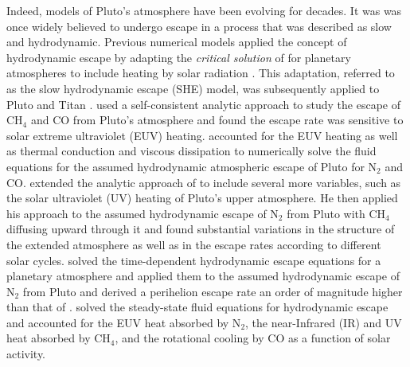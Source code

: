 \documentclass[times,12]{article}
\begin{document}
\indent Indeed, models of Pluto's atmosphere have been evolving for decades. It was was once widely believed to undergo escape in a process that was described as slow and hydrodynamic. Previous numerical models applied the concept of hydrodynamic escape by adapting the \textit{critical solution} of \cite{Parker1964} for planetary atmospheres to include heating by solar radiation \citep{Hunten1982, McNutt1989}. This adaptation, referred to as the slow hydrodynamic escape (SHE) model, was subsequently applied to Pluto \citep{Krasnopolsky1999, Strobel2008} and Titan \citep{strobel2008titan}. \cite{McNutt1989} used a self-consistent analytic approach to study the escape of CH$_4$ and CO from Pluto's atmosphere and found the escape rate was sensitive to solar extreme ultraviolet (EUV) heating. \cite{Yelle1997} accounted for the EUV heating as well as thermal conduction and viscous dissipation to numerically solve the fluid equations for the assumed hydrodynamic atmospheric escape of Pluto for N$_2$ and CO. \cite{Krasnopolsky1999} extended the analytic approach of \cite{McNutt1989} to include several more variables, such as the solar ultraviolet (UV) heating of Pluto's upper atmosphere. He then applied his approach to the assumed hydrodynamic escape of N$_2$ from Pluto with CH$_4$ diffusing upward through it and found substantial variations in the structure of the extended atmosphere as well as in the escape rates according to different solar cycles. \cite{Tian2005} solved the time-dependent hydrodynamic escape equations for a planetary atmosphere and applied them to the assumed hydrodynamic escape of N$_2$ from Pluto and derived a perihelion escape rate an order of magnitude higher than that of \cite{Krasnopolsky1999}. \cite{Strobel2008} solved the steady-state fluid equations for hydrodynamic escape and accounted for the EUV heat absorbed by N$_2$, the near-Infrared (IR) and UV heat absorbed by CH$_4$, and the rotational cooling by CO as a function of solar activity. \\
\end{document}
